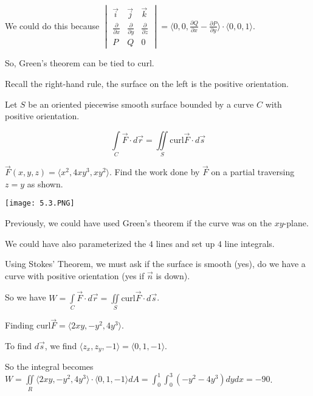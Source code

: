\documentclass[../calc3.tex]{subfiles}
\begin{document}
We could do this because $\begin{vmatrix}
    \vec{i}&\vec{j}&\vec{k}\\
    \frac{\partial}{\partial x} & \frac{\partial}{\partial y}&\frac{\partial}{\partial z}\\
    P & Q & 0
\end{vmatrix} = \langle 0,0,\frac{\partial Q}{\partial x}-\frac{\partial P}{\partial y}\rangle \cdot \langle 0,0,1\rangle$.

So, Green's theorem can be tied to curl.

Recall the right-hand rule, the surface on the left is the positive orientation.

\begin{theorem}
    Let $S$ be an oriented piecewise smooth surface bounded by a curve $C$ with positive orientation.

    \[ \int\limits_{C}\vec{F}\cdot d\vec{r}=\iint\limits_{S}\text{curl}\vec{F}\cdot d\vec{s}\]
\end{theorem}

\pagebreak
\begin{example}
    $\vec{F}(x,y,z)=\langle x^2,4xy^3,xy^2\rangle$. Find the work done by $\vec{F}$ on a partial traversing $z=y$ as shown.

    \begin{center}
        \texttt{[image: 5.3.PNG]}
    \end{center}

    Previously, we could have used Green's theorem if the curve was on the $xy$-plane. 

    We could have also parameterized the $4$ lines and set up $4$ line integrals.

    Using Stokes' Theorem, we must ask if the surface is smooth (yes), do we have a curve with positive orientation (yes if $\vec{n}$ is down).
    
    So we have $W=\int\limits_{C}\vec{F}\cdot d\vec{r}=\iint\limits_{S}\text{curl}\vec{F}\cdot d\vec{s}$.

    Finding curl$\vec{F}=\langle 2xy,-y^2,4y^3\rangle$.

    To find $d\vec{s}$, we find $\langle z_x,z_y,-1\rangle = \langle 0,1,-1\rangle$.

    So the integral becomes $W=\iint\limits_{R}\langle 2xy,-y^2,4y^3\rangle\cdot \langle 0,1,-1\rangle dA = \int_0^1 \int_0^3 (-y^2-4y^3)dy dx = -90$.
\end{example}
\end{document}
